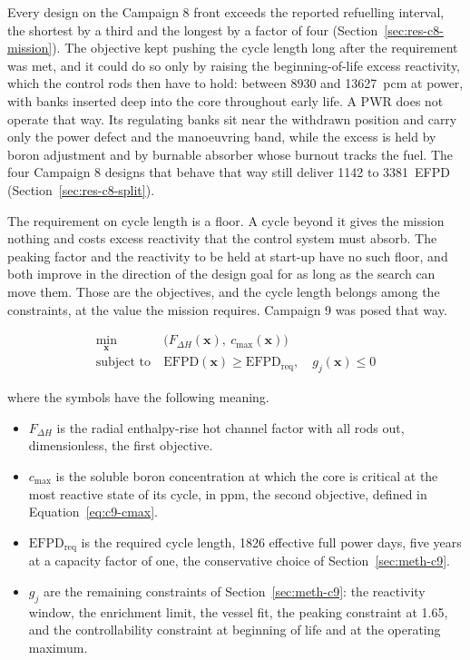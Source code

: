 Every design on the Campaign 8 front exceeds the reported refuelling
interval, the shortest by a third and the longest by a factor of four
(Section~\ref{sec:res-c8-mission}). The objective kept pushing the
cycle length long after the requirement was met, and it could do so
only by raising the beginning-of-life excess reactivity, which the
control rods then have to hold: between \num{8930} and
\SI{13627}{pcm} at power, with banks inserted deep into the core
throughout early life. A PWR does not operate
that way. Its regulating banks sit near the withdrawn position and
carry only the power defect and the manoeuvring band, while the excess
is held by boron adjustment and by burnable absorber whose burnout
tracks the fuel. The four Campaign 8 designs that behave that way still
deliver 1142 to \SI{3381}{EFPD} (Section~\ref{sec:res-c8-split}).

The requirement on cycle length is a floor. A cycle beyond it gives the
mission nothing and costs excess reactivity that the control system
must absorb. The peaking factor and the reactivity to be held at
start-up have no such floor, and both improve in the direction of the
design goal for as long as the search can move them. Those are the
objectives, and the cycle length belongs among the constraints, at the
value the mission requires. Campaign 9 was posed that way.

\begin{equation}
\begin{aligned}
\min_{\mathbf{x}}\ &\big(F_{\Delta H}(\mathbf{x}),\ c_\mathrm{max}(\mathbf{x})\big) \\
\text{subject to}\ &\mathrm{EFPD}(\mathbf{x}) \ge \mathrm{EFPD}_\mathrm{req},\quad
g_j(\mathbf{x}) \le 0
\end{aligned}
\label{eq:concl-reform}
\end{equation}

\noindent where the symbols have the following meaning.

\begin{itemize}
  \item $F_{\Delta H}$ is the radial enthalpy-rise hot channel factor
        with all rods out, dimensionless, the first objective.

  \item $c_\mathrm{max}$ is the soluble boron concentration at which
        the core is critical at the most reactive state of its cycle,
        in ppm, the second objective, defined in
        Equation~\eqref{eq:c9-cmax}.

  \item $\mathrm{EFPD}_\mathrm{req}$ is the required cycle length,
        1826 effective full power days, five years at a capacity factor
        of one, the conservative choice of Section~\ref{sec:meth-c9}.

  \item $g_j$ are the remaining constraints of
        Section~\ref{sec:meth-c9}: the reactivity window, the
        enrichment limit, the vessel fit, the peaking constraint at 1.65, and
        the controllability constraint at beginning of life and at the operating
        maximum.
\end{itemize}

